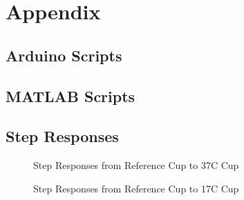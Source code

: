 \documentclass[11pt]{article}
\begin{document}
\newpage

\renewcommand*{\thepage}{A\arabic{page}}
\appendix 
\newpage

\section{Appendix}

\subsection{Arduino Scripts}



\pagebreak
\subsection{MATLAB Scripts}


\pagebreak

\pagebreak


\pagebreak
\subsection{Step Responses}
\begin{figure}[!ht]
    \centering
    \caption{Step Responses from Reference Cup to 37\textdegree C Cup}
    \label{fig:HotCup}
\end{figure}

\begin{figure}[!ht]
    \centering
    \caption{Step Responses from Reference Cup to 17\textdegree C Cup}
    \label{fig:ColdCup}
\end{figure}
\end{document}
